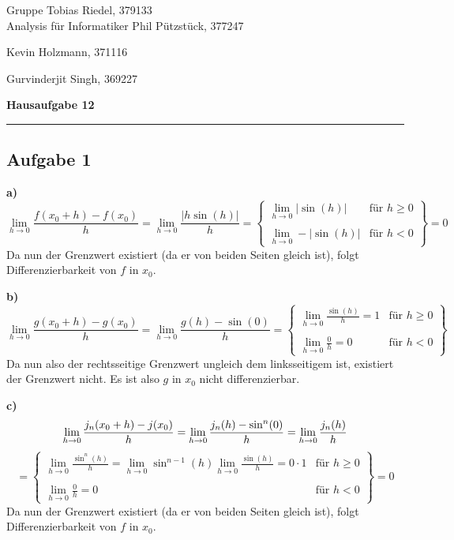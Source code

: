 \documentclass[a4paper,graphics,11pt]{article}
\newcommand{\aufgabe}[1]{\subsection*{Aufgabe #1}}
\begin{document}
\noindent Gruppe              \hfill Tobias Riedel, 379133 \\
\noindent Analysis für Informatiker             \hfill Phil Pützstück, 377247 \\
\strut\hfill Kevin Holzmann, 371116\\
\strut\hfill Gurvinderjit Singh, 369227
\begin{center}
	\LARGE{\textbf{Hausaufgabe 12}}
\end{center}
\begin{center}
\rule[0.1ex]{\textwidth}{1pt}
\end{center}



\aufgabe{1}
\textbf{a)}
$$
    \lim_{h \to 0} \frac{f(x_0+h)-f(x_0)}{h}
    = \lim_{h \to 0} \frac{|h\sin(h)|}{h}
    = \left\{\begin{array}{lr}
        \lim_{h \to 0}\limits |\sin(h)| & \text{für } h \geq 0\\
        \\
        \lim_{h \to 0}\limits -|\sin(h)| & \text{für } h < 0
    \end{array}\right\} = 0
$$
Da nun der Grenzwert existiert (da er von beiden Seiten gleich ist), folgt Differenzierbarkeit von $f$ in $x_0$.

\textbf{b)}
$$
    \lim_{h \to 0} \frac{g(x_0+h)-g(x_0)}{h}
    = \lim_{h \to 0} \frac{g(h)-\sin(0)}{h}
    = \left\{\begin{array}{lr}
        \lim_{h \to 0}\limits \frac{\sin(h)}{h} = 1& \text{für } h \geq 0\\
        \\
        \lim_{h \to 0}\limits \frac{0}{h} = 0 & \text{für } h < 0
    \end{array}\right\}
$$
Da nun also der rechtsseitige Grenzwert ungleich dem linksseitigem ist, existiert der Grenzwert nicht.
Es ist also $g$ in $x_0$ nicht differenzierbar.

\textbf{c)}
$$
    \lim_{h \to 0} \frac{j_n(x_0+h)-j(x_0)}{h}
    = \lim_{h \to 0} \frac{j_n(h)-\sin^n(0)}{h}
	= \lim_{h \to 0} \frac{j_n(h)}{h}\\[5pt]
$$$$
    = \left\{\begin{array}{lr}
		\lim_{h \to 0}\limits \frac{\sin^n(h)}{h}
		= \lim_{h \to 0}\limits\sin^{n-1}(h)\lim_{h \to 0}\limits\frac{\sin(h)}{h}
		= 0\cdot 1 & \text{für } h \geq 0\\
        \\
        \lim_{h \to 0}\limits \frac{0}{h} = 0 & \text{für } h < 0
    \end{array}\right\}
		= 0
$$
Da nun der Grenzwert existiert (da er von beiden Seiten gleich ist), folgt Differenzierbarkeit von $f$ in $x_0$.
\end{document}
